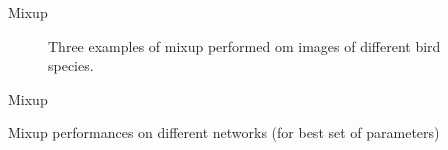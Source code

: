\documentclass[a4paper,10pt]{beamer}
\begin{document}
\begin{frame}{Mixup}
\begin{figure}[!htb]
	\endminipage
	\caption{Three examples of mixup performed om images of different bird species.}
\end{figure}

\end{frame}

\begin{frame}{Mixup}

Mixup performances on different networks (for best set of parameters)

\end{frame}
\end{document}

